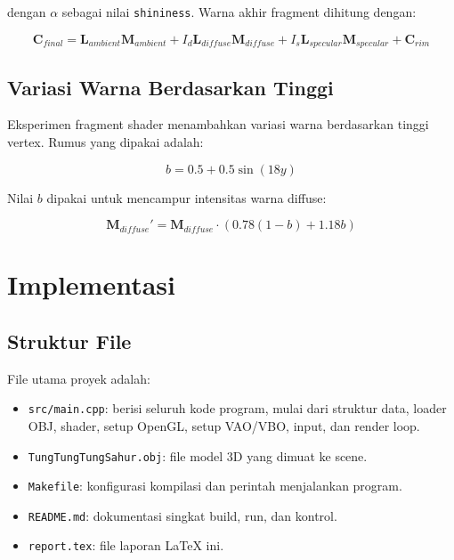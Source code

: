 \documentclass[12pt,a4paper]{article}
\begin{document}
dengan $\alpha$ sebagai nilai \texttt{shininess}. Warna akhir fragment dihitung
dengan:

\begin{equation}
    \mathbf{C}_{final}
    =
    \mathbf{L}_{ambient}\mathbf{M}_{ambient}
    +
    I_d\mathbf{L}_{diffuse}\mathbf{M}_{diffuse}
    +
    I_s\mathbf{L}_{specular}\mathbf{M}_{specular}
    +
    \mathbf{C}_{rim}
\end{equation}

\subsection{Variasi Warna Berdasarkan Tinggi}

Eksperimen fragment shader menambahkan variasi warna berdasarkan tinggi vertex.
Rumus yang dipakai adalah:

\begin{equation}
    b = 0.5 + 0.5\sin(18y)
\end{equation}

Nilai $b$ dipakai untuk mencampur intensitas warna diffuse:

\begin{equation}
    \mathbf{M}_{diffuse}' =
    \mathbf{M}_{diffuse} \cdot
    \left(0.78(1-b) + 1.18b\right)
\end{equation}


\section{Implementasi}

\subsection{Struktur File}

File utama proyek adalah:

\begin{itemize}
    \item \texttt{src/main.cpp}: berisi seluruh kode program, mulai dari
    struktur data, loader OBJ, shader, setup OpenGL, setup VAO/VBO, input, dan
    render loop.
    \item \texttt{TungTungTungSahur.obj}: file model 3D yang dimuat ke scene.
    \item \texttt{Makefile}: konfigurasi kompilasi dan perintah menjalankan
    program.
    \item \texttt{README.md}: dokumentasi singkat build, run, dan kontrol.
    \item \texttt{report.tex}: file laporan LaTeX ini.
\end{itemize}
\end{document}
